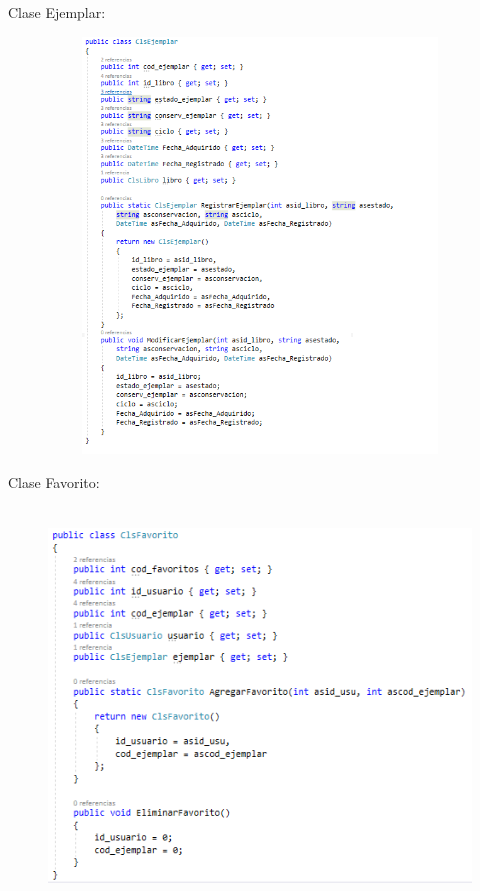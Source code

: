 \documentclass[12pt]{article}
\begin{document}
\begin{enumerate}[label*=\arabic*.]
\begin{enumerate}[label*=\arabic*.]
Clase Ejemplar:
\begin{figure}[H]
	\begin{Center}
		\includegraphics[width=4.91in,height=4.35in]{./media/5.png}
	\end{Center}
\end{figure}


\newpage
Clase Favorito:
\begin{figure}[H]
	\begin{Center}
		\includegraphics[width=4.91in,height=4.15in]{./media/6.png}
	\end{Center}
\end{figure}



\end{enumerate}
\end{enumerate}
\end{document}
